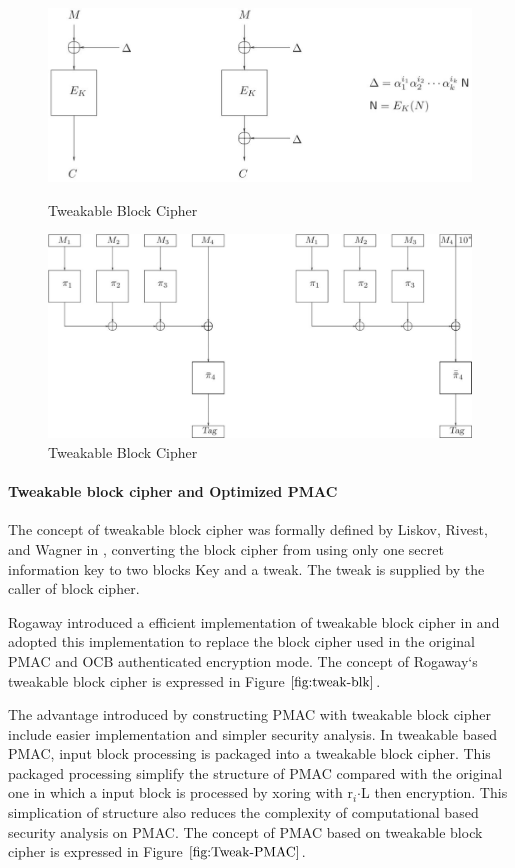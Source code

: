 \documentclass{article}
\begin{document}
\begin{figure}[htbp]
\centering
\includegraphics[scale=0.5]{./diagrams/tweak_blk.pdf}
\caption{Tweakable Block Cipher}
\label{fig:tweak-blk}
\includegraphics[scale=0.3]{./diagrams/tweak_pmac.pdf}
\caption{Tweakable Block Cipher}
\label{fig:Tweak-PMAC}
\end{figure}
\paragraph{Tweakable block cipher and Optimized PMAC}
The concept of tweakable block cipher was formally defined by Liskov, Rivest, and Wagner in \cite{liskov2002tweakable}, converting the block cipher from using only one secret information key to two blocks Key and a tweak. The tweak is supplied by the caller of block cipher. 

Rogaway introduced a efficient implementation of tweakable block cipher in \cite{tweak_pmac}and adopted this implementation to replace the block cipher used in the original PMAC and OCB authenticated encryption mode. The concept of Rogaway`s tweakable block cipher is expressed in Figure $\ref{fig:tweak-blk}$.

The advantage introduced by constructing PMAC with tweakable block cipher include easier implementation and simpler security analysis. In tweakable based PMAC, input block processing is packaged into a tweakable block cipher. This packaged processing simplify the structure of PMAC compared with the original one in which a input block is processed by xoring with r$_i$$\cdot$L then encryption. This simplication of structure also reduces the complexity of computational based security analysis on PMAC.  The concept of PMAC based on tweakable block cipher is expressed in Figure $\ref{fig:Tweak-PMAC}$.
\end{document}
